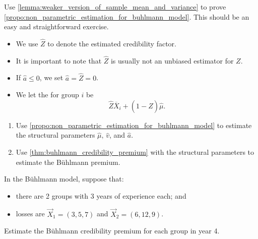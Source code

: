 \documentclass[notoc,notitlepage]{tufte-book}
\begin{document}
\begin{ex}
  Use \cref{lemma:weaker_version_of_sample_mean_and_variance} to
  prove \cref{propo:non_parametric_estimation_for_buhlmann_model}.
  This should be an easy and straightforward exercise.
\end{ex}

\begin{note}
  \begin{itemize}
    \item We use $\hat{Z}$ to denote the estimated credibility factor.
    \item It is important to note that $\hat{Z}$ is usually not
      an unbiased estimator for $Z$.
    \item If $\hat{a} \leq 0$, we set $\hat{a} = \hat{Z} = 0$.
    \item We let the  for group $i$ be
      \begin{equation*}
        \hat{Z} \overline{X}_i + (1 - \hat{Z}) \hat{\mu}.
      \end{equation*}
  \end{itemize}
\end{note}

\begin{procedure}\label{procedure:finding_an_estimated_buhlmann_premium}
  \begin{enumerate}
    \item Use \cref{propo:non_parametric_estimation_for_buhlmann_model}
      to estimate the structural parameters
      $\hat{\mu},\, \hat{v}$, and $\hat{a}$.
    \item Use \cref{thm:buhlmann_credibility_premium}
      with the structural parameters to estimate the B\"{u}hlmann premium.
  \end{enumerate}
\end{procedure}

\begin{eg}
  In the B\"{u}hlmann model, suppose that:
  \begin{itemize}
    \item there are 2 groups with 3 years of experience each; and
    \item losses are $\vec{X}_1 = (3, 5, 7)$ and $\vec{X}_2 = (6, 12, 9)$.
  \end{itemize}
  Estimate the B\"{u}hlmann credibility premium for each group in year 4.
\end{eg}
\end{document}
